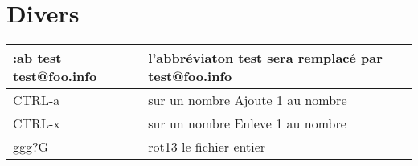 \documentclass{article}
\begin{document}
\section{Divers}
\begin{tabular}{|p{4cm}| l| }
\hline
:ab test test@foo.info & l'abbréviaton test sera remplacé par test@foo.info \\ \hline
    CTRL-a &sur un nombre Ajoute 1 au nombre \\ \hline
    CTRL-x &sur un nombre Enleve 1 au nombre \\ \hline
    ggg?G   & rot13 le fichier entier \\ \hline
\end{tabular}\\
\end{document}
